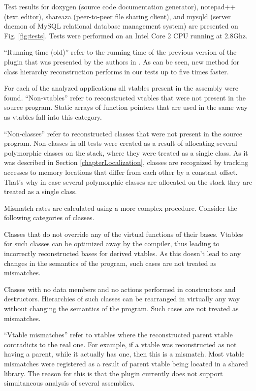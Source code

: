 \documentclass[times, 10pt,twocolumn]{article}
\renewcommand{\~}{{\raise.35ex\hbox{$\scriptstyle\sim$}}}
\renewenvironment{itemize}{
    \begin{list}{\labelitemi}{\itemsep=-\parsep}
}{
	\end{list}
}
\begin{document}
Test results
for doxygen (source code documentation generator),
notepad++ (text editor), shareaza (peer-to-peer file sharing client),
and mysqld (server daemon of MySQL relational database management system)
are presented on Fig. \ref{fig:tests}.
Tests were performed on an Intel Core 2 CPU running at 2.8Ghz.

``Running time (old)'' refer to the running time of the previous
version of the plugin
that was presented by the authors in \cite{fokin10}.
As can be seen, new method for class hierarchy reconstruction performs in our tests
up to five times faster.

For each of the analyzed applications all vtables present in
the assembly were found.
``Non-vtables'' refer to reconstructed vtables that were not present
in the source program. Static arrays of function pointers that are
used in the same way as vtables fall into this category.

``Non-classes'' refer to reconstructed classes that were not present
in the source program. Non-classes in all tests were created as a result of
allocating several polymorphic classes on the stack, where they were
treated as a single class. As it was described in
Section \ref{chapterLocalization}, classes are recognized by tracking
accesses to memory locations that differ from each other
by a constant offset. That's why in case several polymorphic
classes are allocated on the stack they are treated as a single class.

Mismatch rates are calculated using a more
complex procedure. Consider the following categories of classes.
\begin{itemize}
\item Classes that do not override any of the virtual functions of
    their bases. Vtables for such classes can be optimized away by
    the compiler, thus leading to incorrectly reconstructed bases
    for derived vtables. As this doesn't lead to any changes in the semantics of
    the program, such cases are not treated as mismatches.
\item Classes with no data members and no actions performed in
    constructors and destructors. Hierarchies of such classes can be
    rearranged in virtually any way without changing the semantics
    of the program. Such cases are not treated as mismatches.
\end{itemize}

``Vtable mismatches'' refer to vtables where the reconstructed parent vtable
contradicts to the real one. For example, if a vtable was reconstructed
as not having a parent, while it actually has one, then this is a mismatch.
Most vtable mismatches were registered as a result of parent vtable
being located in a shared library. The reason for this is that the plugin currently does not
support simultaneous analysis of several assemblies.
\end{document}
